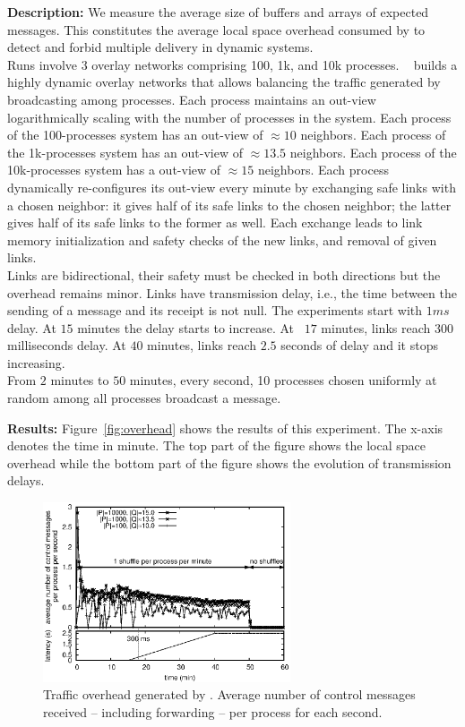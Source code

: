\noindent \textbf{Description:} We measure the average size of buffers and
arrays of expected messages. This constitutes the average local space overhead
consumed by \RPCBROADCAST to detect and forbid multiple delivery in dynamic
systems.\\
Runs involve 3 overlay networks comprising 100, 1k, and 10k
processes. \SPRAY~\cite{nedelec2017adaptive} builds a highly dynamic overlay
networks that allows balancing the traffic generated by broadcasting among
processes. Each process maintains an out-view logarithmically scaling with
the number of processes in the system. Each process of the 100-processes system
has an out-view of $\approx 10$ neighbors. Each process of the 1k-processes
system has an out-view of $\approx 13.5$ neighbors. Each process of the
10k-processes system has a out-view of $\approx 15$ neighbors. Each process
dynamically re-configures its out-view every minute by exchanging safe
links with a chosen neighbor: it gives half of its safe links to the chosen
neighbor; the latter gives half of its safe links to the former as well. Each
exchange leads to link memory initialization and safety checks of the new links,
and removal of given links.\\Links are bidirectional, their safety must be
checked in both directions but the overhead remains minor. Links have
transmission delay, i.e., the time between the sending of a message and its
receipt is not null. The experiments start with $1ms$ delay. At $15$ minutes the
delay starts to increase. At ~$17$ minutes, links reach $300$ milliseconds
delay. At $40$ minutes,
links reach $2.5$ seconds of delay and it stops increasing.\\
From $2$ minutes to $50$ minutes, every second, 10 processes chosen uniformly
at random among all processes broadcast a message.

\noindent \textbf{Results:} Figure~\ref{fig:overhead} shows the results of this
experiment. The x-axis denotes the time in minute. The top part of the figure
shows the local space overhead while the bottom part of the figure shows the
evolution of transmission delays.

\begin{figure}
  \begin{center}
    \includegraphics[width=0.65\textwidth]{./img/controlmessages.eps}
    \caption{\label{fig:controlmessages}Traffic overhead generated by
      \RPCBROADCAST.  Average number of control messages received -- including
      forwarding -- per process for each second.}
  \end{center}
\end{figure}



